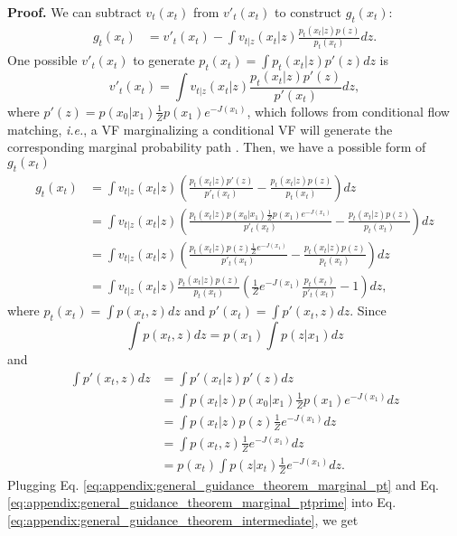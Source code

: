 \textbf{Proof.}
We can subtract $v_t(x_t)$ from $v'_t(x_t)$ to construct $g_t(x_t)$:
\begin{align}
    g_t(x_t) & =  v'_t(x_t) - \int v_{t|z}(x_t|z) \frac{p_t(x_t|z)p(z)}{p_t(x_t)} dz.
\end{align}
One possible $v'_t(x_t)$ to generate $p_t(x_t) = \int p_t(x_t|z)p'(z)dz$ is
\begin{equation}
    v'_t(x_t) = \int v_{t|z}(x_t|z) \frac{p_t(x_t|z)p'(z)}{p'(x_t)} dz,
\end{equation}
where $p'(z) = p(x_0|x_1) \frac{1}{Z}p(x_1)e^{-J(x_1)}$, which follows from conditional flow matching, \emph{i.e.}, a VF marginalizing a conditional VF will generate the corresponding marginal probability path \citep{lipman_flow_2023,tong_improving_2024}.
Then, we have a possible form of $g_t(x_t)$
\begin{align}
    \nonumber g_t(x_t) & = \int v_{t|z}(x_t|z) (\frac{p_t(x_t|z)p'(z)}{p'_t(x_t)} - \frac{p_t(x_t|z)p(z)}{p_t(x_t)}) dz \\
    \nonumber& = \int v_{t|z}(x_t|z) (\frac{p_t(x_t|z)p(x_0|x_1)\frac{1}{Z}p(x_1)e^{-J(x_1)}}{p'_t(x_t)} - \frac{p_t(x_t|z)p(z)}{p_t(x_t)}) dz \\ 
    \nonumber& = \int v_{t|z}(x_t|z) (\frac{p_t(x_t|z)p(z)\frac{1}{Z}e^{-J(x_1)}}{p'_t(x_t)} - \frac{p_t(x_t|z)p(z)}{p_t(x_t)}) dz \\ 
    & = \int v_{t|z}(x_t|z) \frac{p_t(x_t|z)p(z)}{p_t(x_t)} (\frac{1}{Z}e^{-J(x_1)}\frac{p_t(x_t)}{p'_t(x_t)} - 1) dz, \label{eq:appendix:general_guidance_theorem_intermediate}
\end{align}
where $p_t(x_t) = \int p(x_t,z)dz$ and $p'(x_t) = \int p'(x_t,z)dz$.
Since
\begin{equation}
    \int p(x_t,z)dz = p(x_1) \int p(z|x_1)dz\label{eq:appendix:general_guidance_theorem_marginal_pt}
\end{equation}
and 
\begin{align}
     \nonumber\int p'(x_t,z)dz &= \int p'(x_t|z) p'(z)dz  \\
     \nonumber& = \int p(x_t|z) p(x_0|x_1) \frac{1}{Z} p(x_1) e^{-J(x_1)}dz \\ 
     \nonumber& = \int p(x_t|z) p(z) \frac{1}{Z} e^{-J(x_1)}dz \\ 
     \nonumber& = \int p(x_t,z) \frac{1}{Z} e^{-J(x_1)}dz \\ 
     & = p(x_t) \int p(z|x_t) \frac{1}{Z} e^{-J(x_1)}dz .\label{eq:appendix:general_guidance_theorem_marginal_ptprime}
\end{align}
Plugging Eq. \eqref{eq:appendix:general_guidance_theorem_marginal_pt} and Eq. \eqref{eq:appendix:general_guidance_theorem_marginal_ptprime} into Eq. \eqref{eq:appendix:general_guidance_theorem_intermediate}, we get 
